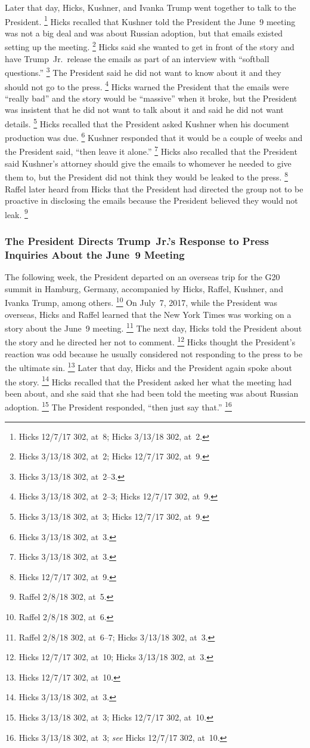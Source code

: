 Later that day, Hicks, Kushner, and Ivanka Trump went together to talk to the President.%
\footnote{Hicks 12/7/17 302, at~8;
Hicks 3/13/18 302, at~2.}
Hicks recalled that Kushner told the President the June~9 meeting was not a big deal and was about Russian adoption, but that emails existed setting up the meeting.%
\footnote{Hicks 3/13/18 302, at~2;
Hicks 12/7/17 302, at~9.}
Hicks said she wanted to get in front of the story and have Trump~Jr.\ release the emails as part of an interview with ``softball questions.''%
\footnote{Hicks 3/13/18 302, at~2--3.}
The President said he did not want to know about it and they should not go to the press.%
\footnote{Hicks 3/13/18 302, at~2--3;
Hicks 12/7/17 302, at~9.}
Hicks warned the President that the emails were ``really bad'' and the story would be ``massive'' when it broke, but the President was insistent that he did not want to talk about it and said he did not want details.%
\footnote{Hicks 3/13/18 302, at~3;
Hicks 12/7/17 302, at~9.}
Hicks recalled that the President asked Kushner when his document production was due.%
\footnote{Hicks 3/13/18 302, at~3.}
Kushner responded that it would be a couple of weeks and the President said, ``then leave it alone.''%
\footnote{Hicks 3/13/18 302, at~3.}
Hicks also recalled that the President said Kushner's attorney should give the emails to whomever he needed to give them to, but the President did not think they would be leaked to the press.%
\footnote{Hicks 12/7/17 302, at~9.}
Raffel later heard from Hicks that the President had directed the group not to be proactive in disclosing the emails because the President believed they would not leak.%
\footnote{Raffel 2/8/18 302, at~5.}

\subsubsection{The President Directs Trump~Jr.'s Response to Press Inquiries About the June~9 Meeting}

The following week, the President departed on an overseas trip for the G20 summit in Hamburg, Germany, accompanied by Hicks, Raffel, Kushner, and Ivanka Trump, among others.%
\footnote{Raffel 2/8/18 302, at~6.}
On July~7, 2017, while the President was overseas, Hicks and Raffel learned that the New York Times was working on a story about the June~9 meeting.%
\footnote{Raffel 2/8/18 302, at~6--7;
Hicks 3/13/18 302, at~3.}
The next day, Hicks told the President about the story and he directed her not to comment.%
\footnote{Hicks 12/7/17 302, at~10;
Hicks 3/13/18 302, at~3.}
Hicks thought the President's reaction was odd because he usually considered not responding to the press to be the ultimate sin.%
\footnote{Hicks 12/7/17 302, at~10.}
Later that day, Hicks and the President again spoke about the story.%
\footnote{Hicks 3/13/18 302, at~3.}
Hicks recalled that the President asked her what the meeting had been about, and she said that she had been told the meeting was about Russian adoption.%
\footnote{Hicks 3/13/18 302, at~3;
Hicks 12/7/17 302, at~10.}
The President responded, ``then just say that.''%
\footnote{Hicks 3/13/18 302, at~3;
\textit{see} Hicks 12/7/17 302, at~10.}

